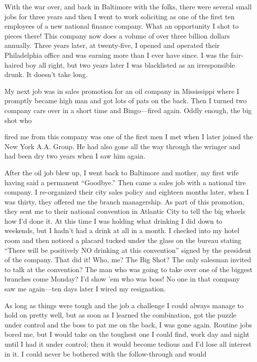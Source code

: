 With the war over, and back in Baltimore with the folks, there were several small jobs for three years and then I went to work soliciting as one of the first ten employees of a new national finance company. What an opportunity I shot to pieces there! This company now does a volume of over three billion dollars annually. Three years later, at twenty-five, I opened and operated their Philadelphia office and was earning more than I ever have since. I was the fair-haired boy all right, but two years later I was blacklisted as an irresponsible drunk. It doesn’t take long.

My next job was in sales promotion for an oil company in Mississippi where I promptly became high man and got lots of pats on the back. Then I turned two company cars over in a short time and Bingo—fired again. Oddly enough, the big shot who

fired me from this company was one of the first men I met when I later joined the New York A.A. Group. He had also gone all the way through the wringer and had been dry two years when I saw him again.

After the oil job blew up, I went back to Baltimore and mother, my first wife having said a permanent “Goodbye.” Then came a sales job with a national tire company. I re-organized their city sales policy and eighteen months later, when I was thirty, they offered me the branch managership. As part of this promotion, they sent me to their national convention in Atlantic City to tell the big wheels how I’d done it. At this time I was holding what drinking I did down to weekends, but I hadn’t had a drink at all in a month. I checked into my hotel room and then noticed a placard tucked under the glass on the bureau stating “There will be positively NO drinking at this convention” signed by the president of the company. That did it! Who, me? The Big Shot? The only salesman invited to talk at the convention? The man who was going to take over one of the biggest branches come Monday? I’d show ’em who was boss! No one in that company saw me again—ten days later I wired my resignation.

As long as things were tough and the job a challenge I could always manage to hold on pretty well, but as soon as I learned the combination, got the puzzle under control and the boss to pat me on the back, I was gone again. Routine jobs bored me, but I would take on the toughest one I could find, work day and night until I had it under control; then it would become tedious and I’d lose all interest in it. I could never be bothered with the follow-through and would

